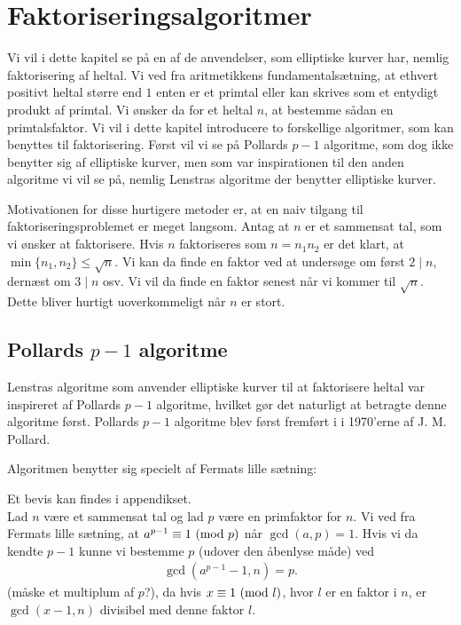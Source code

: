 \chapter{Faktoriseringsalgoritmer}
Vi vil i dette kapitel se på en af de anvendelser, som elliptiske kurver har, nemlig faktorisering af heltal. Vi ved fra aritmetikkens fundamentalsætning, at ethvert positivt heltal større end $1$ enten er et primtal eller kan skrives som et entydigt produkt af primtal. Vi ønsker da for et heltal $n$, at bestemme sådan en primtalsfaktor. Vi vil i dette kapitel introducere to forskellige algoritmer, som kan benyttes til faktorisering. Først vil vi se på Pollards $p-1$ algoritme, som dog ikke benytter sig af elliptiske kurver, men som var inspirationen til den anden algoritme vi vil se på, nemlig Lenstras algoritme der benytter elliptiske kurver.

Motivationen for disse hurtigere metoder er, at en naiv tilgang til faktoriseringsproblemet er meget langsom. Antag at $n$ er et sammensat tal, som vi 
ønsker at faktorisere. Hvis $n$ faktoriseres som $n=n_1 n_2$ er 
det klart, at $\min \{n_1, n_2 \} \leq \sqrt{n}$. Vi kan da finde
en faktor ved at undersøge om først $2 \mid n$, dernæst om 
$3 \mid n$ osv. Vi vil da finde en faktor senest når vi kommer
til $\sqrt{n}$. Dette bliver hurtigt uoverkommeligt når $n$ er stort.

\section{Pollards $p-1$ algoritme}

Lenstras algoritme som anvender elliptiske kurver til at faktorisere heltal var inspireret af Pollards $p-1$ algoritme, hvilket gør det naturligt at betragte denne algoritme først. Pollards $p-1$ algoritme blev først fremført i \cite{Akaike1973}  i 1970'erne af J. M. Pollard.

Algoritmen benytter sig specielt af Fermats lille sætning:

\begin{theorem}

\end{theorem}

Et bevis kan findes i appendikset.
\\[10pt]
Lad $n$ være et sammensat tal og lad $p$ være en primfaktor for $n$. Vi ved fra Fermats lille sætning, at $a^{p-1} \equiv 1 \ (\mathrm{mod} \ p)$ når $\gcd(a, p) = 1$. Hvis vi da kendte $p-1$ kunne vi bestemme $p$ (udover den åbenlyse måde) ved
\begin{align*}
	\gcd(a^{p-1} - 1, n) = p. 
\end{align*}
(måske et multiplum af $p$?), da hvis $x \equiv 1 \ (\mathrm{mod} \ l)$, hvor $l$ er en faktor i $n$, er $\gcd(x-1, n)$ divisibel med denne faktor $l$.

